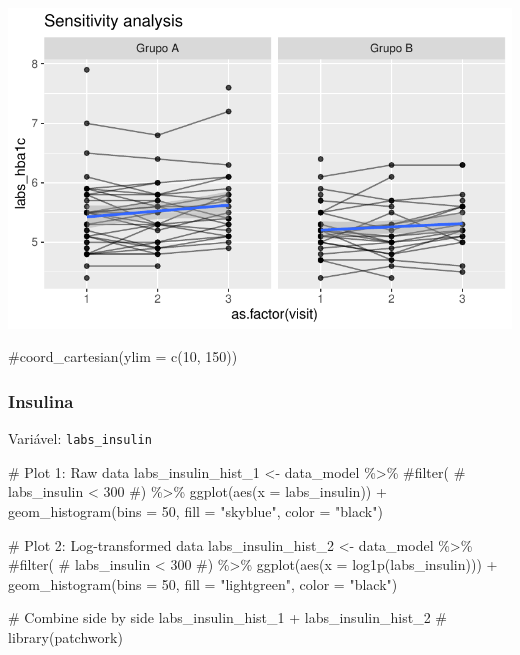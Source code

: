 \documentclass[
  letterpaper,
  DIV=11,
  numbers=noendperiod]{scrartcl}
\newenvironment{Shaded}{\begin{snugshade}}{\end{snugshade}}
\newcommand{\AttributeTok}[1]{\textcolor[rgb]{0.40,0.45,0.13}{#1}}
\newcommand{\CommentTok}[1]{\textcolor[rgb]{0.37,0.37,0.37}{#1}}
\newcommand{\DecValTok}[1]{\textcolor[rgb]{0.68,0.00,0.00}{#1}}
\newcommand{\FunctionTok}[1]{\textcolor[rgb]{0.28,0.35,0.67}{#1}}
\newcommand{\NormalTok}[1]{\textcolor[rgb]{0.00,0.23,0.31}{#1}}
\newcommand{\OtherTok}[1]{\textcolor[rgb]{0.00,0.23,0.31}{#1}}
\newcommand{\SpecialCharTok}[1]{\textcolor[rgb]{0.37,0.37,0.37}{#1}}
\newcommand{\StringTok}[1]{\textcolor[rgb]{0.13,0.47,0.30}{#1}}
\begin{document}
\includegraphics{Outcomes_V1V2V3_files/figure-pdf/labs_hba1c_6-2.pdf}

\begin{Shaded}
\begin{Highlighting}[]
    \CommentTok{\#coord\_cartesian(ylim = c(10, 150))}
\end{Highlighting}
\end{Shaded}

\subsubsection{Insulina}\label{insulina}

Variável: \texttt{labs\_insulin}

\begin{Shaded}
\begin{Highlighting}[]
\CommentTok{\# Plot 1: Raw data}
\NormalTok{labs\_insulin\_hist\_1 }\OtherTok{\textless{}{-}}\NormalTok{ data\_model }\SpecialCharTok{\%\textgreater{}\%} 
    \CommentTok{\#filter(}
    \CommentTok{\#    labs\_insulin \textless{} 300}
    \CommentTok{\#) \%\textgreater{}\% }
    \FunctionTok{ggplot}\NormalTok{(}\FunctionTok{aes}\NormalTok{(}\AttributeTok{x =}\NormalTok{ labs\_insulin)) }\SpecialCharTok{+} 
    \FunctionTok{geom\_histogram}\NormalTok{(}\AttributeTok{bins =} \DecValTok{50}\NormalTok{, }\AttributeTok{fill =} \StringTok{"skyblue"}\NormalTok{, }\AttributeTok{color =} \StringTok{"black"}\NormalTok{)}

\CommentTok{\# Plot 2: Log{-}transformed data}
\NormalTok{labs\_insulin\_hist\_2 }\OtherTok{\textless{}{-}}\NormalTok{ data\_model }\SpecialCharTok{\%\textgreater{}\%} 
    \CommentTok{\#filter(}
    \CommentTok{\#    labs\_insulin \textless{} 300}
    \CommentTok{\#) \%\textgreater{}\%}
    \FunctionTok{ggplot}\NormalTok{(}\FunctionTok{aes}\NormalTok{(}\AttributeTok{x =} \FunctionTok{log1p}\NormalTok{(labs\_insulin))) }\SpecialCharTok{+} 
    \FunctionTok{geom\_histogram}\NormalTok{(}\AttributeTok{bins =} \DecValTok{50}\NormalTok{, }\AttributeTok{fill =} \StringTok{"lightgreen"}\NormalTok{, }\AttributeTok{color =} \StringTok{"black"}\NormalTok{)}

\CommentTok{\# Combine side by side}
\NormalTok{labs\_insulin\_hist\_1 }\SpecialCharTok{+}\NormalTok{ labs\_insulin\_hist\_2 }\CommentTok{\# library(patchwork)}
\end{Highlighting}
\end{Shaded}
\end{document}
